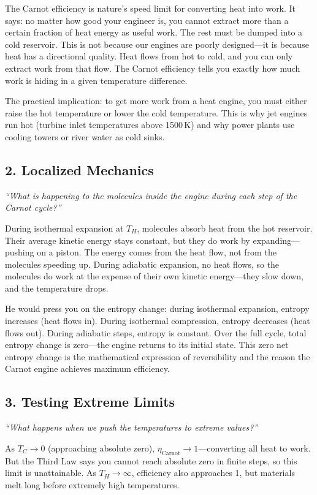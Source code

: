 The Carnot efficiency is nature's speed limit for converting heat into work. It says: no matter how good your engineer is, you cannot extract more than a certain fraction of heat energy as useful work. The rest must be dumped into a cold reservoir. This is not because our engines are poorly designed---it is because heat has a directional quality. Heat flows from hot to cold, and you can only extract work from that flow. The Carnot efficiency tells you exactly how much work is hiding in a given temperature difference.

The practical implication: to get more work from a heat engine, you must either raise the hot temperature or lower the cold temperature. This is why jet engines run hot (turbine inlet temperatures above 1500\,K) and why power plants use cooling towers or river water as cold sinks.

\subsection*{2. Localized Mechanics}
\textit{``What is happening to the molecules inside the engine during each step of the Carnot cycle?''}

During isothermal expansion at $T_H$, molecules absorb heat from the hot reservoir. Their average kinetic energy stays constant, but they do work by expanding---pushing on a piston. The energy comes from the heat flow, not from the molecules speeding up. During adiabatic expansion, no heat flows, so the molecules do work at the expense of their own kinetic energy---they slow down, and the temperature drops.

He would press you on the entropy change: during isothermal expansion, entropy increases (heat flows in). During isothermal compression, entropy decreases (heat flows out). During adiabatic steps, entropy is constant. Over the full cycle, total entropy change is zero---the engine returns to its initial state. This zero net entropy change is the mathematical expression of reversibility and the reason the Carnot engine achieves maximum efficiency.

\subsection*{3. Testing Extreme Limits}
\textit{``What happens when we push the temperatures to extreme values?''}

As $T_C \to 0$ (approaching absolute zero), $\eta_{\text{Carnot}} \to 1$---converting all heat to work. But the Third Law says you cannot reach absolute zero in finite steps, so this limit is unattainable. As $T_H \to \infty$, efficiency also approaches 1, but materials melt long before extremely high temperatures.

